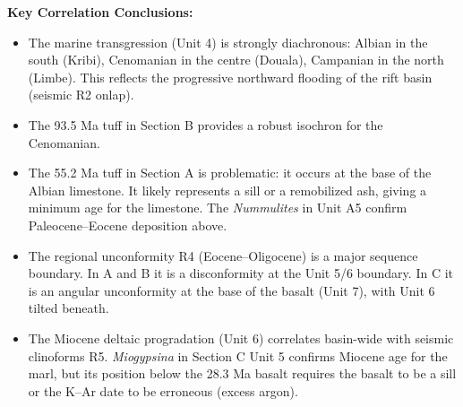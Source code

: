 \documentclass[11pt]{article}
\newcommand{\cle}[1]{{\popxbold\color{popdark}#1}}
\begin{document}
\begin{exoresolu}
\textbf{Key Correlation Conclusions:}
\begin{itemize}
    \item The marine transgression (Unit 4) is strongly \cle{diachronous}: Albian in the south (Kribi), Cenomanian in the centre (Douala), Campanian in the north (Limbe). This reflects the progressive northward flooding of the rift basin (seismic R2 onlap).
    \item The 93.5 Ma tuff in Section B provides a robust \cle{isochron} for the Cenomanian.
    \item The 55.2 Ma tuff in Section A is problematic: it occurs at the base of the Albian limestone. It likely represents a sill or a remobilized ash, giving a minimum age for the limestone. The \emph{Nummulites} in Unit A5 confirm Paleocene–Eocene deposition above.
    \item The regional unconformity R4 (Eocene–Oligocene) is a major sequence boundary. In A and B it is a disconformity at the Unit 5/6 boundary. In C it is an angular unconformity at the base of the basalt (Unit 7), with Unit 6 tilted beneath.
    \item The Miocene deltaic progradation (Unit 6) correlates basin-wide with seismic clinoforms R5. \emph{Miogypsina} in Section C Unit 5 confirms Miocene age for the marl, but its position below the 28.3 Ma basalt requires the basalt to be a sill or the K–Ar date to be erroneous (excess argon).
\end{itemize}
\end{exoresolu}
\end{document}
